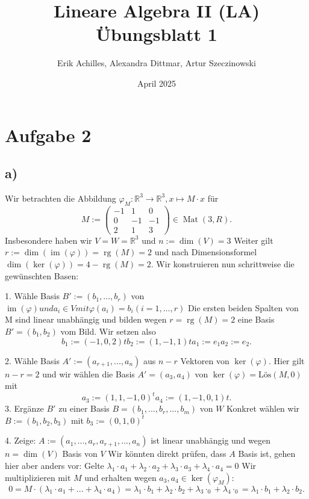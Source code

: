 \documentclass{article}
\title{Lineare Algebra II (LA) Übungsblatt 1}
\author{Erik Achilles, Alexandra Dittmar, Artur Szeczinowski}
\date{April 2025}
\newcommand{\RR}{\mathbb{R}}
\DeclareMathOperator{\Mat}{Mat}
\DeclareMathOperator{\im}{im}
\DeclareMathOperator{\rg}{rg}
\DeclareMathOperator{\Kern}{ker}
\newcommand{\legs}[2]{\left(\begin{array}{#1}#2\end{array}\right)}
\begin{document}
\maketitle
\section*{Aufgabe 2}

\subsection*{a)}

Wir betrachten die Abbildung
$\varphi_M : \RR^3 \to \RR^3, x \mapsto M \cdot x$
für
\[
M :=
\legs{ccc}{
    -1 & 1 & 0  \\
    0 & -1 & -1 \\
    2 & 1 & 3 
}
\in \Mat(3,R).
\]
Insbesondere haben wir
$V = W = \RR^3$
und
$n := \dim(V) = 3$
Weiter gilt
$r := \dim(\im(\varphi)) = \rg(M) = 2$
und nach Dimensionsformel 
$\dim(\Kern(\varphi)) = 4 - \rg(M) = 2$.
Wir konstruieren nun schrittweise die gewünschten Basen:

1. Wähle Basis
$B' := (b_1,\ldots,b_r )$
von 
$\im(\varphi) und a_i \in V mit \varphi(a_i) = b_i (i=1,\ldots,r)$
Die ersten beiden Spalten von M sind linear unabhängig und bilden wegen
$r = \rg(M) = 2$ eine Basis
$B' = (b_1,b_2)$
vom Bild. Wir setzen also
\[
    b_1 := (-1,0,2)t
    b_2 := (1,-1,1)t
    a_1 := e_1
    a_2 := e_2.
\]

2. Wähle Basis
$A' := (a_{r +1},...,a_n)$
 aus $n -r$ Vektoren von
$\Kern(\varphi)$.
Hier gilt
$n -r = 2$
und wir wählen die Basis
$A' = (a_3,a_4)$ von 
$\Kern(\varphi) = \text{Lös}(M,0)$
mit
\[a_3 := (1,1,-1,0)^t
a_4 := (1,-1,0,1)t
.\]
3. Ergänze $B'$
zu einer Basis
$B = (b_1,...,b_r
,...,b_m)$ von $W$
Konkret wählen wir
$B := (b_1,b_2,b_3)$
mit
$b_3 := (0,1,0)^t$

4. Zeige:
$A := (a_1,...,a_r
,a_{r +1},...,a_n)$
ist linear unabhängig und wegen
$n = \dim(V )$
Basis von
$V$
Wir könnten direkt prüfen, dass $A$ Basis ist, gehen hier aber anders vor: Gelte
$\lambda_1 \cdot a_1 +\lambda_2 \cdot a_2 +\lambda_3 \cdot a_3 +\lambda_4 \cdot a_4 = 0$
Wir multiplizieren mit $M$ und erhalten wegen
$a_3,a_4 \in \Kern(\varphi_M )$:
\[
    0 = M \cdot(\lambda_1 \cdot a_1 +...+\lambda_4 \cdot a_4) = \lambda_1 \cdot b_1 +\lambda_2 \cdot b_2 +\lambda_3 \cdot_0+\lambda_4 \cdot_0 = \lambda_1 \cdot b_1 +\lambda_2 \cdot b_2.
\]
\end{document}

